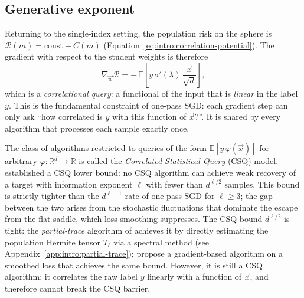 \subsection{Generative exponent}

Returning to the single-index setting, the population risk on the sphere is \(\mathcal{R}(m) = \mathrm{const} - C(m)\) (Equation~\eqref{eq:intro:correlation-potential}). The gradient with respect to the student weights is therefore
\[
    \nabla_{\vec{w}}\mathcal{R} = -\,\mathbb{E}\!\left[y\,\sigma'(\lambda)\,\frac{\vec{x}}{\sqrt{d}}\right],
\]
which is a \emph{correlational query}: a functional of the input that is \emph{linear} in the label \(y\). This is the fundamental constraint of one-pass SGD: each gradient step can only ask ``how correlated is \(y\) with this function of \(\vec{x}\)?''. It is shared by every algorithm that processes each sample exactly once.

The class of algorithms restricted to queries of the form \(\mathbb{E}[y\,\varphi(\vec{x})]\) for arbitrary \(\varphi : \mathbb{R}^d \to \mathbb{R}\) is called the \emph{Correlated Statistical Query} (CSQ) model. \citet{damian2023smoothing} established a CSQ lower bound: no CSQ algorithm can achieve weak recovery of a target with information exponent \(\ell\) with fewer than \(d^{\ell/2}\) samples. This bound is strictly tighter than the \(d^{\ell-1}\) rate of one-pass SGD for \(\ell \geq 3\); the gap between the two arises from the stochastic fluctuations that dominate the escape from the flat saddle, which loss smoothing suppresses. The CSQ bound \(d^{\ell/2}\) is tight: the \emph{partial-trace} algorithm of \citet{pmlr-v65-anandkumar17a} achieves it by directly estimating the population Hermite tensor \(T_\ell\) via a spectral method (see Appendix~\ref{app:intro:partial-trace}); \citet{damian2023smoothing} propose a gradient-based algorithm on a smoothed loss that achieves the same bound. However, it is still a CSQ algorithm: it correlates the raw label \(y\) linearly with a function of \(\vec{x}\), and therefore cannot break the CSQ barrier.

